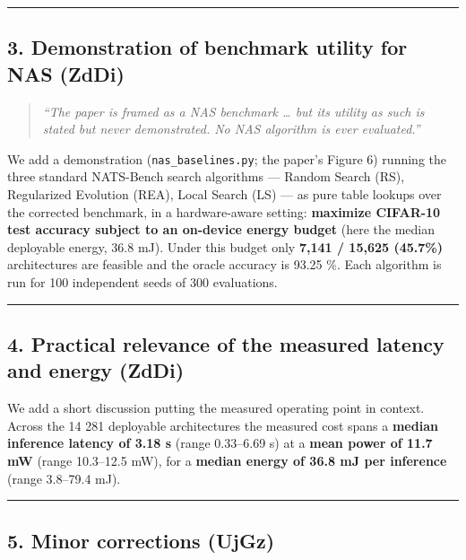 \documentclass[11pt]{article}
\begin{document}
\vspace{2pt}\hrule\vspace{6pt}

\subsection*{3. Demonstration of benchmark utility for NAS (ZdDi)}

\begin{quote}\itshape
\textit{``The paper is framed as a NAS benchmark \ldots{} but its utility as such is stated but never demonstrated. No NAS algorithm is ever evaluated.''}
\end{quote}

We add a demonstration (\texttt{nas\_\allowbreak{}baselines.py}; the paper's Figure 6) running the three standard NATS-Bench search algorithms --- Random Search (RS), Regularized Evolution (REA), Local Search (LS) --- as pure table lookups over the corrected benchmark, in a hardware-aware setting: \textbf{maximize CIFAR-10 test accuracy subject to an on-device energy budget} (here the median deployable energy, 36.8 mJ). Under this budget only \textbf{7,141 / 15,625 (45.7\%)} architectures are feasible and the oracle accuracy is 93.25 \%. Each algorithm is run for 100 independent seeds of 300 evaluations.



\vspace{2pt}\hrule\vspace{6pt}

\subsection*{4. Practical relevance of the measured latency and energy (ZdDi)}

We add a short discussion putting the measured operating point in context. Across the 14 281 deployable architectures the measured cost spans a \textbf{median inference latency of 3.18 s} (range 0.33--6.69 s) at a \textbf{mean power of 11.7 mW} (range 10.3--12.5 mW), for a \textbf{median energy of 36.8 mJ per inference} (range 3.8--79.4 mJ).


\vspace{2pt}\hrule\vspace{6pt}

\subsection*{5. Minor corrections (UjGz)}
\end{document}
